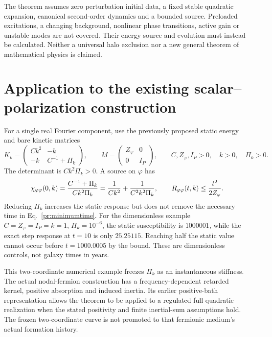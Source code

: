 \documentclass[11pt]{article}
\begin{document}
The theorem assumes zero perturbation initial data, a fixed stable
quadratic expansion, canonical second-order dynamics and a bounded source.
Preloaded excitations, a changing background, nonlinear phase transitions,
active gain or unstable modes are not covered. Their energy source and
evolution must instead be calculated. Neither a universal halo exclusion
nor a new general theorem of mathematical physics is claimed.

\section{Application to the existing scalar--polarization construction}
For a single real Fourier component, use the previously proposed static
energy and bare kinetic matrices
\begin{equation}
 K_k=\begin{pmatrix}Ck^2&-k\\-k&C^{-1}+\Pi_k\end{pmatrix},\qquad
 M=\begin{pmatrix}Z_\varphi&0\\0&I_P\end{pmatrix},\qquad
 C,Z_\varphi,I_P>0,\quad k>0,\quad\Pi_k>0.
\end{equation}
The determinant is $Ck^2\Pi_k>0$. A source on $\varphi$ has
\begin{equation}
 \chi_{\varphi\varphi}(0,k)
 ={C^{-1}+\Pi_k\over Ck^2\Pi_k}
 ={1\over Ck^2}+{1\over C^2k^2\Pi_k},\qquad
 R_{\varphi\varphi}(t,k)\leq {t^2\over2Z_\varphi}.
 \label{pr:twofield}
\end{equation}
Reducing $\Pi_k$ increases the static response but does not remove the
necessary time in Eq.~\eqref{pr:minimumtime}. For the dimensionless example
$C=Z_\varphi=I_P=k=1$, $\Pi_k=10^{-6}$, the static susceptibility is
$1000001$, while the exact step response at $t=10$ is only $25.25115$.
Reaching half the static value cannot occur before $t=1000.0005$ by the
bound. These are dimensionless controls, not galaxy times in years.

This two-coordinate numerical example freezes $\Pi_k$ as an instantaneous
stiffness. The actual nodal-fermion construction has a frequency-dependent
retarded kernel, positive absorption and induced inertia. Its earlier
positive-bath representation allows the theorem to be applied to a
regulated full quadratic realization when the stated positivity and finite
inertial-sum assumptions hold. The frozen two-coordinate curve is not
promoted to that fermionic medium's actual formation history.
\end{document}

